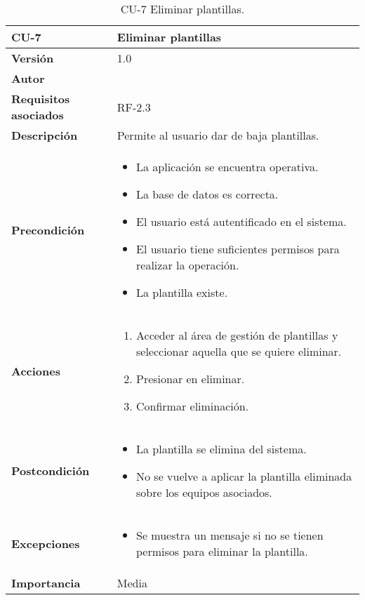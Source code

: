 \begin{table}[p]
	\centering
	\begin{tabularx}{\linewidth}{ p{} p{} }
		\toprule
		\textbf{CU-7}    & \textbf{ Eliminar plantillas}\\
		\toprule
		\textbf{Versión}              & 1.0    \\
		\textbf{Autor}                & \@author{} \\
		\textbf{Requisitos asociados} & RF-2.3\\
		\textbf{Descripción}          & Permite al usuario dar de baja plantillas.\\
		\textbf{Precondición}         &
		\begin{itemize}
			\tightlist
			\item La aplicación se encuentra operativa.
			\item La base de datos es correcta.
			\item El usuario está autentificado en el sistema.
			\item El usuario tiene suficientes permisos para realizar la operación.
			\item La plantilla existe.
		\end{itemize}\\
		\textbf{Acciones}             &
		\begin{enumerate}
			\tightlist
			\item Acceder al área de gestión de plantillas y seleccionar aquella que se quiere eliminar.
			\item Presionar en eliminar.
			\item Confirmar eliminación.
		\end{enumerate}\\
		\textbf{Postcondición} &
		\begin{itemize}
			\tightlist
			\item La plantilla se elimina del sistema.
			\item No se vuelve a aplicar la plantilla eliminada sobre los equipos asociados.
		\end{itemize}\\
		\textbf{Excepciones}          &
		\begin{itemize}
			\tightlist
			\item Se muestra un mensaje si no se tienen permisos para eliminar la plantilla.
		\end{itemize}\\
		\textbf{Importancia}          & Media\\
		\bottomrule
	\end{tabularx}
	\caption{CU-7 Eliminar plantillas.}\label{tab:table-7}
\end{table}

